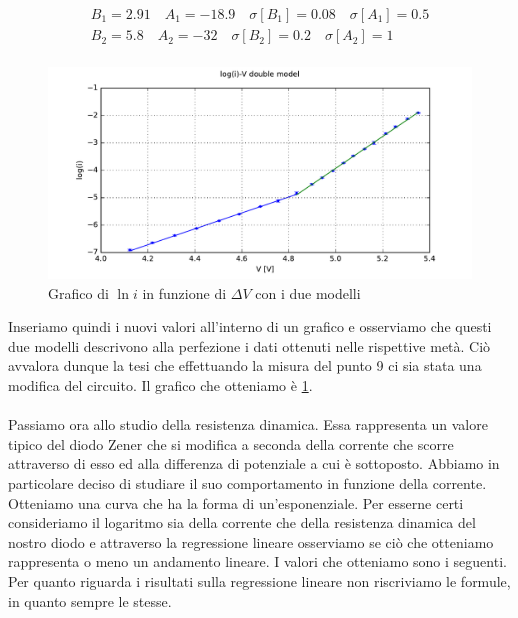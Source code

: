 \begin{gather}
    B_1 = 2.91 \quad A_1 = -18.9 \quad \sigma[B_1] = 0.08 \quad \sigma[A_1] = 0.5
    \\
    B_2 = 5.8 \quad A_2 = -32 \quad \sigma[B_2] = 0.2 \quad \sigma[A_2] = 1
    \\
    \label{eq:regr2}
\end{gather}

\begin{figure} [h!]
    \centering
    \includegraphics[width=\textwidth]{fig3Z.pdf} 
    \caption{Grafico di $\ln{i}$ in funzione di $\Delta V$ con i due modelli}
    \label{fig:gZc}
\end{figure}

Inseriamo quindi i nuovi valori all'interno di un grafico e osserviamo che questi due modelli descrivono alla perfezione i dati ottenuti nelle rispettive metà. Ciò avvalora dunque la tesi che effettuando la misura del punto 9 ci sia stata una modifica del circuito. Il grafico che otteniamo è \ref{fig:gZc}. \\ \\


Passiamo ora allo studio della resistenza dinamica. Essa rappresenta un valore tipico del diodo Zener che si modifica a seconda della corrente che scorre attraverso di esso ed alla differenza di potenziale a cui è sottoposto. Abbiamo in particolare deciso di studiare il suo comportamento in funzione della corrente. Otteniamo una curva che ha la forma di un'esponenziale. Per esserne certi consideriamo il logaritmo sia della corrente che della resistenza dinamica del nostro diodo e attraverso la regressione lineare osserviamo se ciò che otteniamo rappresenta o meno un andamento lineare. I valori che otteniamo sono i seguenti. Per quanto riguarda i risultati sulla regressione lineare non riscriviamo le formule, in quanto sempre le stesse. \\

